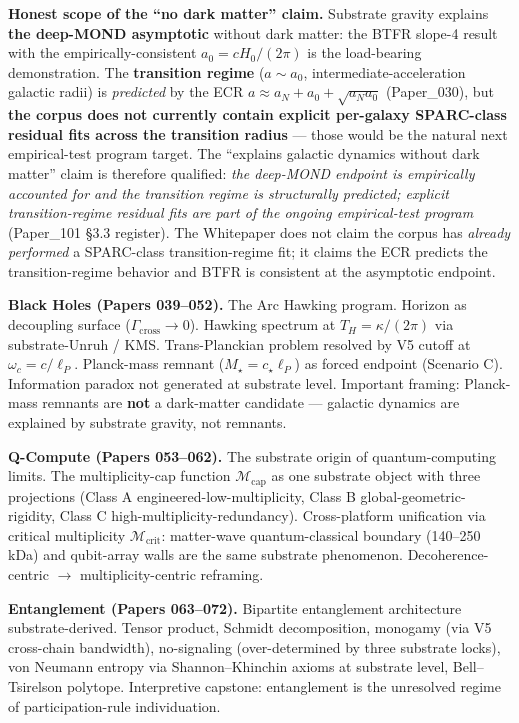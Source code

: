 \documentclass[11pt,a4paper]{article}
\begin{document}
\textbf{Honest scope of the ``no dark matter'' claim.} Substrate gravity explains \textbf{the deep-MOND asymptotic} without dark matter: the BTFR slope-4 result with the empirically-consistent $a_0 = cH_0/(2\pi)$ is the load-bearing demonstration. The \textbf{transition regime} ($a \sim a_0$, intermediate-acceleration galactic radii) is \emph{predicted} by the ECR $a \approx a_N + a_0 + \sqrt{a_N a_0}$ (Paper\_030), but \textbf{the corpus does not currently contain explicit per-galaxy SPARC-class residual fits across the transition radius} --- those would be the natural next empirical-test program target. The ``explains galactic dynamics without dark matter'' claim is therefore qualified: \emph{the deep-MOND endpoint is empirically accounted for and the transition regime is structurally predicted; explicit transition-regime residual fits are part of the ongoing empirical-test program} (Paper\_101 \S3.3 register). The Whitepaper does not claim the corpus has \emph{already performed} a SPARC-class transition-regime fit; it claims the ECR predicts the transition-regime behavior and BTFR is consistent at the asymptotic endpoint.

\textbf{Black Holes (Papers 039--052).} The Arc Hawking program. Horizon as decoupling surface ($\Gamma_\mathrm{cross} \to 0$). Hawking spectrum at $T_H = \kappa/(2\pi)$ via substrate-Unruh / KMS. Trans-Planckian problem resolved by V5 cutoff at $\omega_c = c/\ell_P$. Planck-mass remnant ($M_\star = c_\star \ell_P$) as forced endpoint (Scenario C). Information paradox not generated at substrate level. Important framing: Planck-mass remnants are \textbf{not} a dark-matter candidate --- galactic dynamics are explained by substrate gravity, not remnants.

\textbf{Q-Compute (Papers 053--062).} The substrate origin of quantum-computing limits. The multiplicity-cap function $\mathcal{M}_\mathrm{cap}$ as one substrate object with three projections (Class A engineered-low-multiplicity, Class B global-geometric-rigidity, Class C high-multiplicity-redundancy). Cross-platform unification via critical multiplicity $\mathcal{M}_\mathrm{crit}$: matter-wave quantum-classical boundary (140--250 kDa) and qubit-array walls are the same substrate phenomenon. Decoherence-centric $\to$ multiplicity-centric reframing.

\textbf{Entanglement (Papers 063--072).} Bipartite entanglement architecture substrate-derived. Tensor product, Schmidt decomposition, monogamy (via V5 cross-chain bandwidth), no-signaling (over-determined by three substrate locks), von Neumann entropy via Shannon--Khinchin axioms at substrate level, Bell--Tsirelson polytope. Interpretive capstone: entanglement is the unresolved regime of participation-rule individuation.
\end{document}
